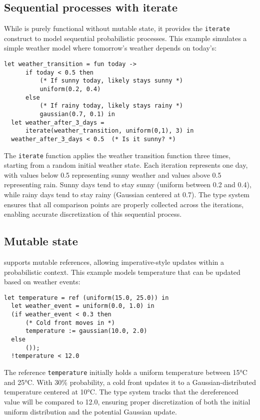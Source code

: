 \documentclass[acmsmall,screen,dvipsnames,x11names,nonacm,anonymous,review]{acmart}
\newcommand{\Slice}{\text{\scshape Slice}\xspace}
\begin{document}
\subsection{Sequential processes with iterate}

While \Slice is purely functional without mutable state, it provides the \texttt{iterate} construct to model sequential probabilistic processes. This example simulates a simple weather model where tomorrow's weather depends on today's:

\begin{lstlisting}[aboveskip=1em,belowskip=1em,escapechar=!]
  let weather_transition = fun today ->
      if today < 0.5 then 
          (* If sunny today, likely stays sunny *)
          uniform(0.2, 0.4)
      else  
          (* If rainy today, likely stays rainy *)
          gaussian(0.7, 0.1) in
  let weather_after_3_days = 
      iterate(weather_transition, uniform(0,1), 3) in
  weather_after_3_days < 0.5  (* Is it sunny? *)
\end{lstlisting}

\noindent The \texttt{iterate} function applies the weather transition function three times, starting from a random initial weather state. Each iteration represents one day, with values below 0.5 representing sunny weather and values above 0.5 representing rain. Sunny days tend to stay sunny (uniform between 0.2 and 0.4), while rainy days tend to stay rainy (Gaussian centered at 0.7). The type system ensures that all comparison points are properly collected across the iterations, enabling accurate discretization of this sequential process.

\subsection{Mutable state}

\Slice supports mutable references, allowing imperative-style updates within a probabilistic context. This example models temperature that can be updated based on weather events:

\begin{lstlisting}[aboveskip=1em,belowskip=1em,escapechar=!]
  let temperature = ref (uniform(15.0, 25.0)) in
  let weather_event = uniform(0.0, 1.0) in
  (if weather_event < 0.3 then
      (* Cold front moves in *)
      temperature := gaussian(10.0, 2.0)
  else
      ());
  !temperature < 12.0
\end{lstlisting}

\noindent The reference \texttt{temperature} initially holds a uniform temperature between 15°C and 25°C. With 30\% probability, a cold front updates it to a Gaussian-distributed temperature centered at 10°C. The type system tracks that the dereferenced value will be compared to 12.0, ensuring proper discretization of both the initial uniform distribution and the potential Gaussian update.
\end{document}
